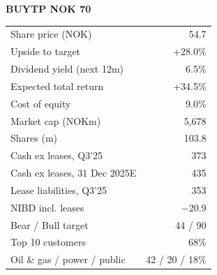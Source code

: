 \documentclass[10pt,a4paper]{article}
\begin{document}
\begin{minipage}[t]{0.34\textwidth}
\vspace{0pt}
\begin{tcolorbox}[colback=tint,colframe=navy,boxrule=0.6pt,arc=1pt,left=5pt,right=5pt,top=4pt,bottom=4pt]
{\color{navy}\Large\bfseries BUY}\hfill{\color{navy}\bfseries TP NOK 70}\par
\vspace{2pt}
\small
\begin{tabularx}{\linewidth}{@{}Xr@{}}
Share price (NOK) & 54.7 \\
Upside to target & +28.0\% \\
Dividend yield (next 12m) & 6.5\% \\
Expected total return & +34.5\% \\
Cost of equity & 9.0\% \\
\midrule
Market cap (NOKm) & 5,678 \\
Shares (m) & 103.8 \\
Cash ex leases, Q3'25 & 373 \\
Cash ex leases, 31 Dec 2025E & 435 \\
Lease liabilities, Q3'25 & 353 \\
NIBD incl. leases & $-$20.9 \\
\midrule
Bear / Bull target & 44 / 90 \\
Top 10 customers & 68\% \\
Oil \& gas / power / public & 42 / 20 / 18\% \\
\end{tabularx}
\end{tcolorbox}
\end{minipage}
\end{document}
